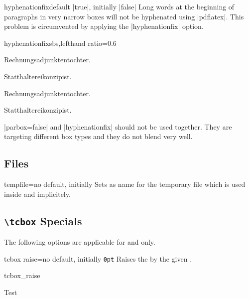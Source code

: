 \clearpage
\begin{docTcbKey}{hyphenationfix}{}{default |true|, initially |false|}
  Long words at the beginning of paragraphs in very narrow boxes
  will not be hyphenated using |pdflatex|. This problem is circumvented by
  applying the |hyphenationfix| option.

\begin{exdispExample*}{hyphenationfix}{sbs,lefthand ratio=0.6}

\begin{tcolorbox}
Rechnungsadjunktentochter.\par
Statthaltereikonzipist.
\end{tcolorbox}

\begin{tcolorbox}[hyphenationfix]
Rechnungsadjunktentochter.\par
Statthaltereikonzipist.
\end{tcolorbox}
\end{exdispExample*}

\smallskip
\begin{marker}
|parbox=false| and |hyphenationfix| should not be used together. They are
targeting different box types and they do not blend very well.
\end{marker}
\end{docTcbKey}


\subsection{Files}
\begin{docTcbKey}{tempfile}{=}{no default, initially }
  Sets  as name for the temporary file which is used inside
   and  implicitely.
\end{docTcbKey}

\subsection{\texttt{\textbackslash tcbox} Specials}
The following options are applicable for  and 
only.

\begin{docTcbKey}{tcbox raise}{=}{no default, initially \texttt{0pt}}
  Raises the  by the given .
\begin{exdispExample}{tcbox_raise}

Test\dotfill
{}\dotfill
{}\dotfill
{}
\end{exdispExample}
\end{docTcbKey}

